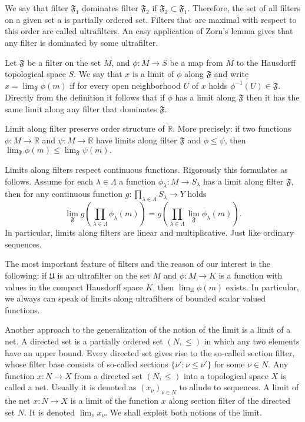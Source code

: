 We say that filter $\mathfrak{F}_1$ dominates filter $\mathfrak{F}_2$ if
$\mathfrak{F}_2\subset\mathfrak{F}_1$. Therefore, the set of all filters on a
given set a is partially ordered set. Filters that are maximal with respect to
this order are called ultrafilters. An easy application of Zorn's lemma gives
that any filter is dominated by some ultrafilter.

Let $\mathfrak{F}$ be a filter on the set $M$, and $\phi:M\to S$ be a map from
$M$ to the Hausdorff topological space $S$. We say that $x$ is a limit of $\phi$
along $\mathfrak{F}$ and write $x=\lim_{\mathfrak{F}} \phi(m)$ if for every open
neighborhood $U$ of $x$ holds $\phi^{-1}(U)\in\mathfrak{F}$. Directly from the
definition it follows that if $\phi$ has a limit along $\mathfrak{F}$ then it
has the same limit along any filter that dominates $\mathfrak{F}$. 

Limit along filter preserve order structure of $\mathbb{R}$. More precisely: if
two functions $\phi:M\to\mathbb{R}$ and $\psi:M\to\mathbb{R}$ have limits along
filter $\mathfrak{F}$ and $\phi\leq\psi$, then 
$
\lim_{\mathfrak{F}}\phi(m)\leq\lim_{\mathfrak{F}}\psi(m).
$

Limits along filters respect continuous functions. Rigorously this formulates as
follows. Assume for each $\lambda\in\Lambda$ a function $\phi_\lambda:M\to
S_\lambda$ has a limit along filter $\mathfrak{F}$, then for any continuous
function $g:\prod_{\lambda\in\Lambda}S_\lambda\to Y$ holds
$$
\lim_{\mathfrak{F}}g\left(
  \prod_{\lambda\in\Lambda}\phi_\lambda(m)
\right)
=g\left(\prod_{\lambda\in\Lambda}\lim_{\mathfrak{F}}\phi_\lambda(m)\right).
$$
In particular, limits along filters are linear and multiplicative. Just like
ordinary sequences.

The most important feature of filters and the reason of our interest is the
following: if $\mathfrak{U}$ is an ultrafilter on the set $M$ and $\phi:M\to K$
is a function with values in the compact Hausdorff space $K$, then
$\lim_{\mathfrak{U}}\phi(m)$ exists. In particular, we always can speak of
limits along ultrafilters of bounded scalar valued functions.

Another approach to the generalization of the notion of the limit is a limit of
a net. A directed set is a partially ordered set $(N,\leq)$ in which any two
elements have an upper bound. Every directed set gives rise to the so-called
section filter, whose filter base consists of so-called sections $
\{\nu':\nu\leq\nu' \}$ for some $\nu\in N$. Any function $x:N\to X$ from a
directed set $(N,\leq)$ into a topological space $X$ is called a net. Usually
it is denoted as ${(x_\nu)}_{\nu\in N}$ to allude to sequences. 
A limit of the net $x:N\to X$ is a limit of the function $x$ along section
filter of the directed set $N$. It is denoted $\lim_\nu x_\nu$. We shall exploit
both notions of the limit.

